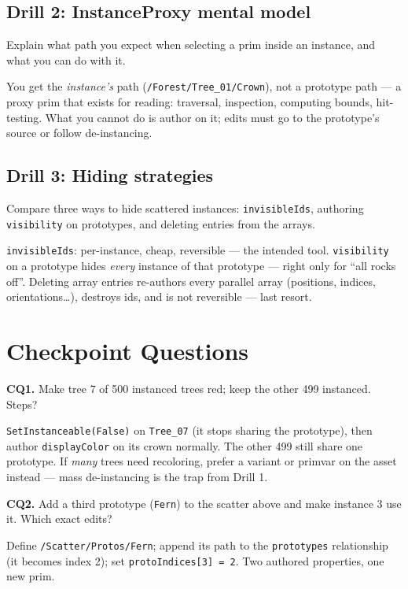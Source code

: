 \subsection*{Drill 2: InstanceProxy mental model}
Explain what path you expect when selecting a prim inside an instance, and
what you can do with it.
\begin{DrillSolution}
You get the \emph{instance's} path (\texttt{/Forest/Tree\_01/Crown}), not a
prototype path --- a proxy prim that exists for reading: traversal,
inspection, computing bounds, hit-testing. What you cannot do is author on
it; edits must go to the prototype's source or follow de-instancing.
\end{DrillSolution}

\subsection*{Drill 3: Hiding strategies}
Compare three ways to hide scattered instances: \texttt{invisibleIds},
authoring \texttt{visibility} on prototypes, and deleting entries from the
arrays.
\begin{DrillSolution}
\texttt{invisibleIds}: per-instance, cheap, reversible --- the intended tool.
\texttt{visibility} on a prototype hides \emph{every} instance of that
prototype --- right only for ``all rocks off''. Deleting array entries
re-authors every parallel array (positions, indices, orientations\ldots),
destroys ids, and is not reversible --- last resort.
\end{DrillSolution}

\section*{Checkpoint Questions}

\noindent\textbf{CQ1.} Make tree 7 of 500 instanced trees red; keep the other
499 instanced. Steps?
\begin{DrillSolution}
\texttt{SetInstanceable(False)} on \texttt{Tree\_07} (it stops sharing the
prototype), then author \texttt{displayColor} on its crown normally. The
other 499 still share one prototype. If \emph{many} trees need recoloring,
prefer a variant or primvar on the asset instead --- mass de-instancing is
the trap from Drill 1.
\end{DrillSolution}

\noindent\textbf{CQ2.} Add a third prototype (\texttt{Fern}) to the scatter
above and make instance 3 use it. Which exact edits?
\begin{DrillSolution}
Define \texttt{/Scatter/Protos/Fern}; append its path to the
\texttt{prototypes} relationship (it becomes index 2); set
\texttt{protoIndices[3] = 2}. Two authored properties, one new prim.
\end{DrillSolution}

